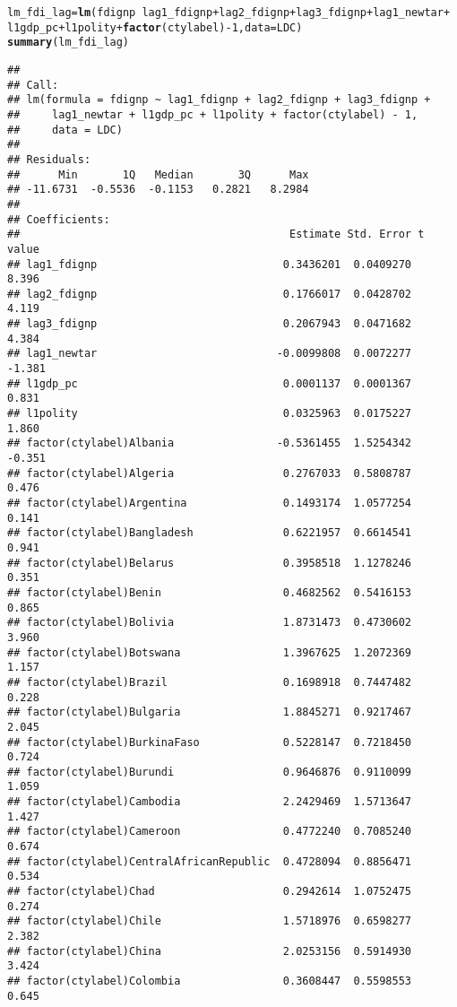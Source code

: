 \documentclass[12pt]{article}\usepackage[]{graphicx}\usepackage[]{color}
\makeatletter
\newcommand{\hlnum}[1]{\textcolor[rgb]{0.686,0.059,0.569}{#1}}%
\newcommand{\hlopt}[1]{\textcolor[rgb]{0,0,0}{#1}}%
\newcommand{\hlstd}[1]{\textcolor[rgb]{0.345,0.345,0.345}{#1}}%
\newcommand{\hlkwb}[1]{\textcolor[rgb]{0.69,0.353,0.396}{#1}}%
\newcommand{\hlkwc}[1]{\textcolor[rgb]{0.333,0.667,0.333}{#1}}%
\newcommand{\hlkwd}[1]{\textcolor[rgb]{0.737,0.353,0.396}{\textbf{#1}}}%
\newenvironment{kframe}{%
 \def\at@end@of@kframe{}%
 \ifinner\ifhmode%
  \def\at@end@of@kframe{\end{minipage}}%
  \begin{minipage}{\columnwidth}%
 \fi\fi%
 \def\FrameCommand##1{\hskip\@totalleftmargin \hskip-\fboxsep
 \colorbox{shadecolor}{##1}\hskip-\fboxsep
     \hskip-\linewidth \hskip-\@totalleftmargin \hskip\columnwidth}%
 \MakeFramed {\advance\hsize-\width
   \@totalleftmargin\z@ \linewidth\hsize
   \@setminipage}}%
 {\par\unskip\endMakeFramed%
 \at@end@of@kframe}
\newenvironment{knitrout}{}{} %
\makeatother
\begin{document}
\begin{knitrout}
\begin{kframe}
\begin{alltt}
\hlstd{lm_fdi_lag} \hlkwb{=} \hlkwd{lm}\hlstd{(fdignp} \hlopt{~} \hlstd{lag1_fdignp} \hlopt{+} \hlstd{lag2_fdignp} \hlopt{+} \hlstd{lag3_fdignp} \hlopt{+} \hlstd{lag1_newtar} \hlopt{+}
    \hlstd{l1gdp_pc} \hlopt{+} \hlstd{l1polity} \hlopt{+} \hlkwd{factor}\hlstd{(ctylabel)} \hlopt{-} \hlnum{1}\hlstd{,} \hlkwc{data} \hlstd{= LDC)}
\hlkwd{summary}\hlstd{(lm_fdi_lag)}
\end{alltt}
\begin{verbatim}
## 
## Call:
## lm(formula = fdignp ~ lag1_fdignp + lag2_fdignp + lag3_fdignp + 
##     lag1_newtar + l1gdp_pc + l1polity + factor(ctylabel) - 1, 
##     data = LDC)
## 
## Residuals:
##      Min       1Q   Median       3Q      Max 
## -11.6731  -0.5536  -0.1153   0.2821   8.2984 
## 
## Coefficients:
##                                          Estimate Std. Error t value
## lag1_fdignp                             0.3436201  0.0409270   8.396
## lag2_fdignp                             0.1766017  0.0428702   4.119
## lag3_fdignp                             0.2067943  0.0471682   4.384
## lag1_newtar                            -0.0099808  0.0072277  -1.381
## l1gdp_pc                                0.0001137  0.0001367   0.831
## l1polity                                0.0325963  0.0175227   1.860
## factor(ctylabel)Albania                -0.5361455  1.5254342  -0.351
## factor(ctylabel)Algeria                 0.2767033  0.5808787   0.476
## factor(ctylabel)Argentina               0.1493174  1.0577254   0.141
## factor(ctylabel)Bangladesh              0.6221957  0.6614541   0.941
## factor(ctylabel)Belarus                 0.3958518  1.1278246   0.351
## factor(ctylabel)Benin                   0.4682562  0.5416153   0.865
## factor(ctylabel)Bolivia                 1.8731473  0.4730602   3.960
## factor(ctylabel)Botswana                1.3967625  1.2072369   1.157
## factor(ctylabel)Brazil                  0.1698918  0.7447482   0.228
## factor(ctylabel)Bulgaria                1.8845271  0.9217467   2.045
## factor(ctylabel)BurkinaFaso             0.5228147  0.7218450   0.724
## factor(ctylabel)Burundi                 0.9646876  0.9110099   1.059
## factor(ctylabel)Cambodia                2.2429469  1.5713647   1.427
## factor(ctylabel)Cameroon                0.4772240  0.7085240   0.674
## factor(ctylabel)CentralAfricanRepublic  0.4728094  0.8856471   0.534
## factor(ctylabel)Chad                    0.2942614  1.0752475   0.274
## factor(ctylabel)Chile                   1.5718976  0.6598277   2.382
## factor(ctylabel)China                   2.0253156  0.5914930   3.424
## factor(ctylabel)Colombia                0.3608447  0.5598553   0.645

\end{verbatim}
\end{kframe}
\end{knitrout}
\end{document}
